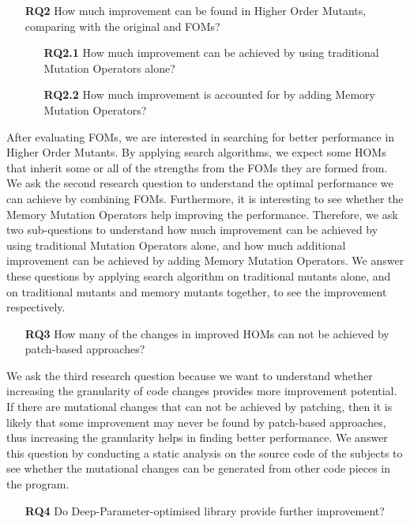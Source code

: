 \documentclass[oribibl]{llncs}
\begin{document}
\begin{enumerate}
\item[\textbf{RQ2}] How much improvement can be found in Higher Order Mutants, comparing with the original and FOMs?
\begin{enumerate}
\item[\textbf{RQ2.1}] How much improvement can be achieved by using traditional Mutation Operators alone?
\item[\textbf{RQ2.2}] How much improvement is accounted for by adding Memory Mutation Operators?
\end{enumerate}
\end{enumerate}

After evaluating FOMs, we are interested in searching for better performance in Higher Order Mutants.
By applying search algorithms, we expect some HOMs that inherit some or all of the strengths from the FOMs they are formed from.
We ask the second research question to understand the optimal performance we can achieve by combining FOMs.
Furthermore, it is interesting to see whether the Memory Mutation Operators help improving the performance.
Therefore, we ask two sub-questions to understand how much improvement can be achieved by using traditional Mutation Operators alone, and how much additional improvement can be achieved by adding Memory Mutation Operators.
We answer these questions by applying search algorithm on traditional mutants alone, and on traditional mutants and memory mutants together, to see the improvement respectively.

\begin{enumerate}
\item[\textbf{RQ3}] How many of the changes in improved HOMs can not be achieved by patch-based approaches?
\end{enumerate}

We ask the third research question because we want to understand whether increasing the granularity of code changes provides more improvement potential.
If there are mutational changes that can not be achieved by patching, then it is likely that some improvement may never be found by patch-based approaches, thus increasing the granularity helps in finding better performance.
We answer this question by conducting a static analysis on the source code of the subjects to see whether the mutational changes can be generated from other code pieces in the program.

\begin{enumerate}
\item[\textbf{RQ4}] Do Deep-Parameter-optimised library provide further improvement?
\end{enumerate}
\end{document}
